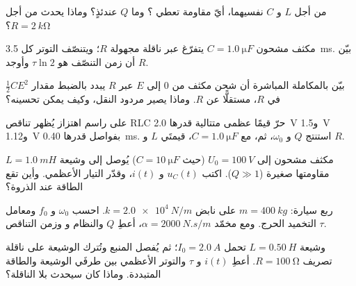 \begin{exercise}[$\star$]\label{exo:b1:transient-regimes:4}
من أجل $L$ و $C$ نفسيهما، أيّ مقاومة تعطي ؟
وما $Q$ عندئذٍ؟ وماذا يحدث من أجل $R = \qty{2}{k\ohm}$؟
\end{exercise}

\begin{exercise}[$\star\star$]\label{exo:b1:transient-regimes:5}
مكثف مشحون $C = \qty{1.0}{\micro F}$ يتفرّغ عبر ناقلة
مجهولة $R$؛ ويتنصّف التوتر كل \qty{3.5}{ms}. بيّن أن
زمن التنصّف هو $\tau\ln 2$ وأوجد $R$.
\end{exercise}

\begin{exercise}[$\star\star$]\label{exo:b1:transient-regimes:6}
بيّن بالمكاملة المباشرة أن شحن مكثف من $0$ إلى $E$
عبر $R$ يبدد بالضبط مقدار $\tfrac12 CE^2$ في $R$، مستقلًّا عن
$R$. وماذا يصير مردود النقل، وكيف يمكن
تحسينه؟
\end{exercise}

\begin{exercise}[$\star\star$]\label{exo:b1:transient-regimes:7}
على راسم اهتزاز يُظهر تناقص RLC حرّ قيمًا عظمى متتالية قدرها
\qty{2.0}{V} و\qty{1.5}{V} و\qty{1.12}{V} بفواصل قدرها \qty{0.40}{ms}.
استنتج $Q$ و $\omega_0$، ثم، مع $C = \qty{1.0}{\micro F}$، قيمتَي
$L$ و $R$.
\end{exercise}

\begin{exercise}[$\star\star$]\label{exo:b1:transient-regimes:8}
مكثف مشحون إلى $U_0 = \qty{100}{V}$ (حيث $C = \qty{10}{\micro F}$)
يُوصل إلى وشيعة $L = \qty{1.0}{mH}$ مقاومتها صغيرة ($Q \gg 1$).
اكتب $u_C(t)$ و $i(t)$، وقدّر التيار الأعظمي. وأين تقع
الطاقة عند الذروة؟
\end{exercise}

\begin{exercise}[$\star\star$]\label{exo:b1:transient-regimes:9}
ربع سيارة: $m = \qty{400}{kg}$ على نابض $k = \qty{2.0e4}{N/m}$.
احسب $\omega_0$ و $f_0$ ومعامل التخميد الحرج. ومع
مخمّد $\alpha = \qty{2000}{N.s/m}$، أعطِ $Q$ والنظام و
 وزمن التناقص $\tau$.
\end{exercise}

\begin{exercise}[$\star\star\star$]\label{exo:b1:transient-regimes:10}
وشيعة $L = \qty{0.50}{H}$ تحمل $I_0 = \qty{2.0}{A}$؛ ثم يُفصل المنبع
وتُترك الوشيعة على ناقلة تصريف $R = \qty{100}{\ohm}$.
أعطِ $i(t)$ و $\tau$ والتوتر الأعظمي بين طرفَي الوشيعة والطاقة
المتبددة. وماذا كان سيحدث بلا الناقلة؟
\end{exercise}

